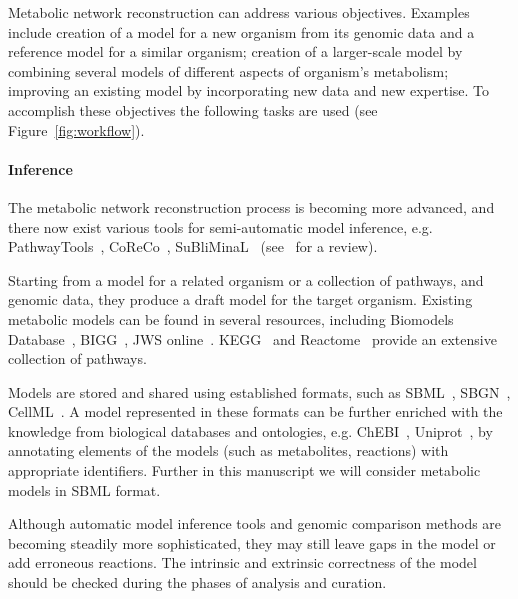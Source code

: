 \documentclass{bmcart}
\begin{document}
Metabolic network reconstruction can address various objectives. Examples include creation of a model for a new organism from its genomic data and a reference model for a similar organism; creation of a larger-scale model by combining several models of different aspects of organism's metabolism; improving an existing model by incorporating new data and new expertise. To accomplish these objectives the following tasks are used (see Figure~\ref{fig:workflow}). 

\paragraph{Inference}

The metabolic network reconstruction process is becoming more advanced, and there now exist various tools for semi-automatic model inference, e.g. PathwayTools~\cite{Karp2002}, CoReCo~\cite{Pitkanen2014}, SuBliMinaL~\cite{Swainston2011} (see~\cite{Hamilton2014} for a review).

Starting from a model for a related organism or a collection of pathways, and genomic data, they produce a draft model for the target organism. Existing metabolic models can be found in several resources, including Biomodels Database~\cite{Li10}, BIGG~\cite{Schellenberger2010}, JWS online~\cite{Snoep2003}. KEGG~\cite{Kanehisa12} and Reactome~\cite{Milacic2012, Croft2013} provide an extensive collection of pathways. 

Models are stored and shared using established formats, such as SBML~\cite{Hucka2003}, SBGN~\cite{LeNovere2009}, CellML~\cite{Lloyd2004}. A model represented in these formats can be further enriched with the knowledge from biological databases and ontologies, e.g. ChEBI~\cite{deMatos10}, Uniprot~\cite{TheUniProtConsortium2014}, by annotating elements of the models (such as metabolites, reactions) with appropriate identifiers. Further in this manuscript we will consider metabolic models in SBML format.

Although automatic model inference tools and genomic comparison methods are becoming steadily more sophisticated, they may still leave gaps in the model or add erroneous reactions. The intrinsic and extrinsic correctness of the model should be checked during the phases of analysis and curation.
\end{document}

